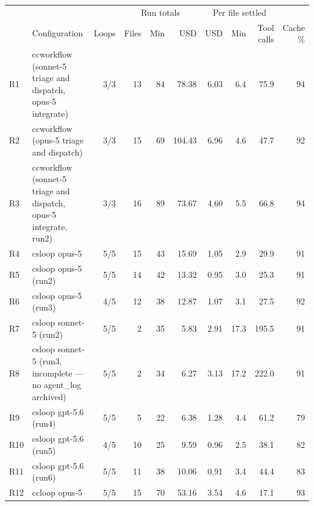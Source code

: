 \begin{tabular}{@{}llrrrrrrrr@{}}
  \toprule
  & & & \multicolumn{3}{c}{Run totals} & \multicolumn{3}{c}{Per file settled} & \\
  \cmidrule(lr){4-6}\cmidrule(lr){7-9}
  & Configuration & Loops & Files & Min & USD & USD & Min & Tool calls & Cache \%\\
  \midrule
    R1 & ccworkflow (sonnet-5 triage and dispatch, opus-5 integrate) & 3/3 & 13 & 84 & 78.38 & 6.03 & 6.4 & 75.9 & 94 \\
    R2 & ccworkflow (opus-5 triage and dispatch) & 3/3 & 15 & 69 & 104.43 & 6.96 & 4.6 & 47.7 & 92 \\
    R3 & ccworkflow (sonnet-5 triage and dispatch, opus-5 integrate, run2) & 3/3 & 16 & 89 & 73.67 & 4.60 & 5.5 & 66.8 & 94 \\
    R4 & csloop opus-5 & 5/5 & 15 & 43 & 15.69 & 1.05 & 2.9 & 29.9 & 91 \\
    R5 & csloop opus-5 (run2) & 5/5 & 14 & 42 & 13.32 & 0.95 & 3.0 & 25.3 & 91 \\
    R6 & csloop opus-5 (run3) & 4/5 & 12 & 38 & 12.87 & 1.07 & 3.1 & 27.5 & 92 \\
    R7 & csloop sonnet-5 (run2) & 5/5 & 2 & 35 & 5.83 & 2.91 & 17.3 & 195.5 & 91 \\
    R8 & csloop sonnet-5 (run3, incomplete — no agent\_log archived) & 5/5 & 2 & 34 & 6.27 & 3.13 & 17.2 & 222.0 & 91 \\
    R9 & csloop gpt-5.6 (run4) & 5/5 & 5 & 22 & 6.38 & 1.28 & 4.4 & 61.2 & 79 \\
    R10 & csloop gpt-5.6 (run5) & 4/5 & 10 & 25 & 9.59 & 0.96 & 2.5 & 38.1 & 82 \\
    R11 & csloop gpt-5.6 (run6) & 5/5 & 11 & 38 & 10.06 & 0.91 & 3.4 & 44.4 & 83 \\
    R12 & ccloop opus-5 & 5/5 & 15 & 70 & 53.16 & 3.54 & 4.6 & 17.1 & 93 \\
  \bottomrule
\end{tabular}
